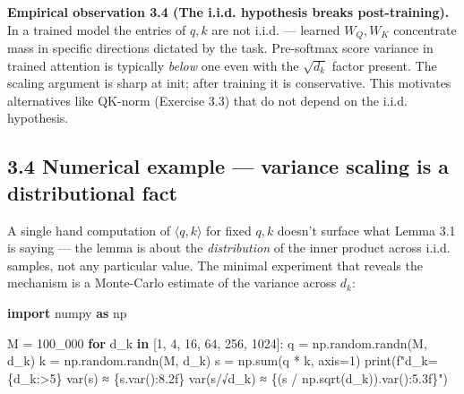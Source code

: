 \documentclass[
]{article}
\newenvironment{Shaded}{}{}
\newcommand{\BuiltInTok}[1]{\textcolor[rgb]{0.00,0.50,0.00}{#1}}
\newcommand{\ControlFlowTok}[1]{\textcolor[rgb]{0.00,0.44,0.13}{\textbf{#1}}}
\newcommand{\DecValTok}[1]{\textcolor[rgb]{0.25,0.63,0.44}{#1}}
\newcommand{\ImportTok}[1]{\textcolor[rgb]{0.00,0.50,0.00}{\textbf{#1}}}
\newcommand{\KeywordTok}[1]{\textcolor[rgb]{0.00,0.44,0.13}{\textbf{#1}}}
\newcommand{\NormalTok}[1]{#1}
\newcommand{\OperatorTok}[1]{\textcolor[rgb]{0.40,0.40,0.40}{#1}}
\newcommand{\SpecialCharTok}[1]{\textcolor[rgb]{0.25,0.44,0.63}{#1}}
\newcommand{\SpecialStringTok}[1]{\textcolor[rgb]{0.73,0.40,0.53}{#1}}
\begin{document}
\textbf{Empirical observation 3.4 (The i.i.d. hypothesis breaks
post-training).} In a trained model the entries of \(q, k\) are not
i.i.d. --- learned \(W_Q, W_K\) concentrate mass in specific directions
dictated by the task. Pre-softmax score variance in trained attention is
typically \emph{below} one even with the \(\sqrt{d_k}\) factor present.
The scaling argument is sharp at init; after training it is
conservative. This motivates alternatives like QK-norm (Exercise 3.3)
that do not depend on the i.i.d. hypothesis.

\hypertarget{numerical-example-variance-scaling-is-a-distributional-fact}{%
\subsection{3.4 Numerical example --- variance scaling is a
distributional
fact}\label{numerical-example-variance-scaling-is-a-distributional-fact}}

A single hand computation of \(\langle q, k \rangle\) for fixed \(q, k\)
doesn't surface what Lemma 3.1 is saying --- the lemma is about the
\emph{distribution} of the inner product across i.i.d. samples, not any
particular value. The minimal experiment that reveals the mechanism is a
Monte-Carlo estimate of the variance across \(d_k\):

\begin{Shaded}
\begin{Highlighting}[]
\ImportTok{import}\NormalTok{ numpy }\ImportTok{as}\NormalTok{ np}

\NormalTok{M }\OperatorTok{=} \DecValTok{100\_000}
\ControlFlowTok{for}\NormalTok{ d\_k }\KeywordTok{in}\NormalTok{ [}\DecValTok{1}\NormalTok{, }\DecValTok{4}\NormalTok{, }\DecValTok{16}\NormalTok{, }\DecValTok{64}\NormalTok{, }\DecValTok{256}\NormalTok{, }\DecValTok{1024}\NormalTok{]:}
\NormalTok{    q }\OperatorTok{=}\NormalTok{ np.random.randn(M, d\_k)}
\NormalTok{    k }\OperatorTok{=}\NormalTok{ np.random.randn(M, d\_k)}
\NormalTok{    s }\OperatorTok{=}\NormalTok{ np.}\BuiltInTok{sum}\NormalTok{(q }\OperatorTok{*}\NormalTok{ k, axis}\OperatorTok{=}\DecValTok{1}\NormalTok{)}
    \BuiltInTok{print}\NormalTok{(}\SpecialStringTok{f"d\_k=}\SpecialCharTok{\{}\NormalTok{d\_k}\SpecialCharTok{:\textgreater{}5\}}\SpecialStringTok{  var(s) ≈ }\SpecialCharTok{\{}\NormalTok{s}\SpecialCharTok{.}\NormalTok{var()}\SpecialCharTok{:8.2f\}}\SpecialStringTok{   var(s/√d\_k) ≈ }\SpecialCharTok{\{}\NormalTok{(s }\OperatorTok{/}\NormalTok{ np.sqrt(d\_k))}\SpecialCharTok{.}\NormalTok{var()}\SpecialCharTok{:5.3f\}}\SpecialStringTok{"}\NormalTok{)}
\end{Highlighting}
\end{Shaded}
\end{document}
